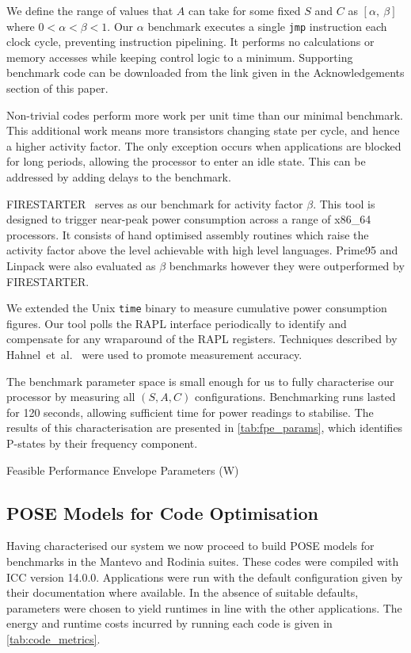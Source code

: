 We define the range of values that $A$ can take for some fixed $S$ and $C$ as $[\alpha,~\beta]$ where $0 < \alpha < \beta < 1$.
Our $\alpha$ benchmark executes a single \texttt{jmp} instruction each clock cycle, preventing instruction pipelining.
It performs no calculations or memory accesses while keeping control logic to a minimum.
Supporting benchmark code can be downloaded from the link given in the Acknowledgements section of this paper.

Non-trivial codes perform more work per unit time than our minimal benchmark.
This additional work means more transistors changing state per cycle, and hence a higher activity factor.
The only exception occurs when applications are blocked for long periods, allowing the processor to enter an idle state.
This can be addressed by adding delays to the benchmark.

FIRESTARTER~\cite{hackenberg:2013ab} serves as our benchmark for activity factor $\beta$.
This tool is designed to trigger near-peak power consumption across a range of x86\_64 processors.
It consists of hand optimised assembly routines which raise the activity factor above the level achievable with high level languages.
Prime95 and Linpack were also evaluated as $\beta$ benchmarks however they were outperformed by FIRESTARTER.

We extended the Unix \texttt{time} binary to measure cumulative power consumption figures.
Our tool polls the RAPL interface periodically to identify and compensate for any wraparound of the RAPL registers.
Techniques described by Hahnel~et~al.~\cite{hahnel:2012aa} were used to promote measurement accuracy.

The benchmark parameter space is small enough for us to fully characterise our processor by measuring all $(S,A,C)$ configurations.
Benchmarking runs lasted for 120 seconds, allowing sufficient time for power readings to stabilise.
The results of this characterisation are presented in \autoref{tab:fpe_params}, which identifies P-states by their frequency component.
\begin{table}
  \scriptsize
  \centering
  \caption{Feasible Performance Envelope Parameters (W)}
  \label{tab:fpe_params}
  
\end{table}

\subsection{POSE Models for Code Optimisation}
\noindent
Having characterised our system we now proceed to build POSE models for benchmarks in the Mantevo and Rodinia suites.
These codes were compiled with ICC version 14.0.0.
Applications were run with the default configuration given by their documentation where available.
In the absence of suitable defaults, parameters were chosen to yield runtimes in line with the other applications.
The energy and runtime costs incurred by running each code is given in \autoref{tab:code_metrics}.

